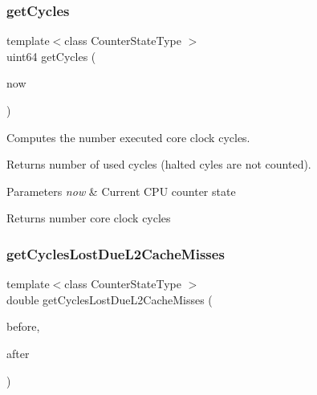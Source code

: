 \subsubsection{\texorpdfstring{get\+Cycles}{getCycles}\hspace{0.1cm}{\footnotesize\ttfamily [2/2]}}
{\footnotesize\ttfamily template$<$class Counter\+State\+Type $>$ \\
uint64 get\+Cycles (\begin{DoxyParamCaption}\item[{const Counter\+State\+Type \&}]{now }\end{DoxyParamCaption})\hspace{0.3cm}{\ttfamily [friend]}}



Computes the number executed core clock cycles. 

Returns number of used cycles (halted cyles are not counted).


\begin{DoxyParams}{Parameters}
{\em now} & Current C\+PU counter state \\
\hline
\end{DoxyParams}
\begin{DoxyReturn}{Returns}
number core clock cycles 
\end{DoxyReturn}
\mbox{\label{class_basic_counter_state_ac26765efe8a4c7341f40c8ab8bdb9af6}} 
\subsubsection{\texorpdfstring{get\+Cycles\+Lost\+Due\+L2\+Cache\+Misses}{getCyclesLostDueL2CacheMisses}}
{\footnotesize\ttfamily template$<$class Counter\+State\+Type $>$ \\
double get\+Cycles\+Lost\+Due\+L2\+Cache\+Misses (\begin{DoxyParamCaption}\item[{const Counter\+State\+Type \&}]{before,  }\item[{const Counter\+State\+Type \&}]{after }\end{DoxyParamCaption})\hspace{0.3cm}{\ttfamily [friend]}}




